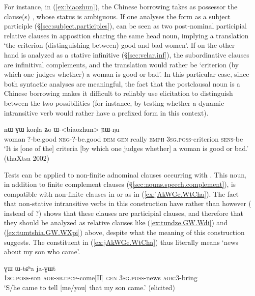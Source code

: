 For instance, in (\ref{ex:biaozhun}), the Chinese borrowing   takes as possessor the clause(s) , whose status is ambiguous. If one analyses the form  as a subject participle (§\ref{sec:subject.participles}),  can be seen as two post-nominal participial relative clauses in apposition sharing the same head noun, implying a translation `the criterion (distinguishing between) good and bad women'. If on the other hand  is analyzed as a stative infinitive (§\ref{sec:velar.inf}), the subordinative clauses are infinitival complements, and the translation would rather be `criterion (by which one judges whether) a woman is good or bad'. In this particular case, since both syntactic analyses are meaningful, the fact that the postclausal noun is a Chinese borrowing makes it difficult to reliably use elicitation to distinguish between the two possibilities (for instance, by testing whether a dynamic intransitive verb would rather have a  prefixed form in this context).

\begin{exe}
\ex  \label{ex:biaozhun}
\gll   	[tɕʰeme kɯ-pe mɤ-kɯ-pe] nɯ ɣɯ koŋla ʑo ɯ-<biaozhun>   ɲɯ-ŋu   \\
woman ?-be.good \textsc{neg}-?-be.good \textsc{dem} \textsc{gen} really \textsc{emph} \textsc{3sg}.\textsc{poss}-criterion \textsc{sens}-be \\
\glt `It is [one of the] criteria [by which one judges whether] a woman is good or bad.' (thaXtsa 2002)
\end{exe}

Tests can be applied to non-finite adnominal clauses occurring with . This noun, in addition to finite complement clauses (§\ref{sec:nouns.speech.complement}), is compatible with non-finite clauses in  or  as in (\ref{ex:jAkWGe.WtCha}). The fact that non-stative intransitive verbs in this construction have  rather than  however ( instead of ?) shows that these clauses are participial clauses, and therefore that they should be analyzed as relative clauses like (\ref{ex:tundze.GW.Wdi}) and (\ref{ex:tumtshia.GW.WXpi}) above, despite what the meaning of this construction suggests. The constituent  in (\ref{ex:jAkWGe.WtCha}) thus literally means `news about my son who came'.

\begin{exe}
\ex  \label{ex:jAkWGe.WtCha}
\gll  [a-tɕɯ jɤ-kɯ-ɣe] ɣɯ ɯ-tɕʰa ja-ɣɯt\\
\textsc{1sg}.\textsc{poss}-son \textsc{aor}-\textsc{sbj}:\textsc{pcp}-come[II]  \textsc{gen} \textsc{3sg}.\textsc{poss}-news \textsc{aor}:3\flobv{}-bring\\
 \glt `S/he came to tell [me/you] that my son came.' (elicited)
 \end{exe}



